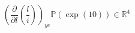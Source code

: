 \documentclass{article}
\begin{document}
$$
\left({\frac{\partial}{\partial l} \left(\frac{l}{i}\right)}\right)_{ye}\mathbb{P} \left(\exp \left(10\right)\right)\in \mathbb{R}^{4}
$$
\end{document}
